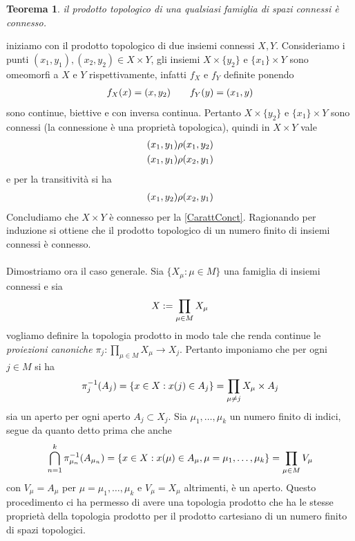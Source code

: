 \documentclass[oneside, 11pt]{amsbook}
\makeatletter
\newcommand{\0}{{(0)}}
\newcommand{\3}{{(3)}}
\theoremstyle{colonplain}
\newtheorem{thm}{Teorema}[chapter]
\theoremstyle{colondefinition}
\theoremstyle{colonremark}
\numberwithin{equation}{chapter}
\renewcommand{\proofname}{Dimostrazione}
\renewenvironment{proof}[1][\proofname]{\par
  \pushQED{\qed}%
  \normalfont \topsep6\p@\@plus6\p@\relax
  \trivlist
  \item[\hskip\labelsep\bfseries #1:]\ignorespaces
}{%
  \popQED\endtrivlist\@endpefalse
}
\makeatother
\begin{document}
\begin{thm}
il prodotto topologico di una qualsiasi famiglia di spazi connessi è connesso.
\end{thm}
\begin{proof}
iniziamo con il prodotto topologico di due insiemi connessi $X, Y$. Consideriamo i punti $(x_1, y_1), (x_2, y_2) \in X \times Y$, gli insiemi $X \times \{ y_2 \}$ e $\{ x_1 \} \times Y$ sono omeomorfi a $X$ e $Y$ rispettivamente, infatti $f_X$ e $f_Y$ definite ponendo
\begin{align}
    f_X(x) = (x, y_2) \qquad f_Y(y) = (x_1, y) \notag
\end{align}
sono continue, biettive e con inversa continua. Pertanto $X \times \{ y_2 \}$ e $\{ x_1 \} \times Y$ sono connessi (la connessione è una proprietà topologica), quindi in $X \times Y$ vale
\begin{align}
    (x_1, y_1) \rho (x_1, y_2) \notag \\
    (x_1, y_1) \rho (x_2, y_1) \notag
\end{align}
e per la transitività si ha
\begin{align}
    (x_1, y_2) \rho (x_2, y_1) \notag
\end{align}
Concludiamo che $X \times Y$ è connesso per la \cref{CarattConct}. Ragionando per induzione si ottiene che il prodotto topologico di un numero finito di insiemi connessi è connesso. \\ \\
Dimostriamo ora il caso generale. Sia $\{ X_\mu : \mu \in M \}$ una famiglia di insiemi connessi e sia 
\begin{align}
    X := \prod_{\mu \in M} X_\mu \notag
\end{align}
vogliamo definire la topologia prodotto in modo tale che renda continue le \textit{proiezioni canoniche} $\pi_j : \prod_{\mu \in M} X_\mu \longrightarrow X_j$. Pertanto imponiamo che per ogni $j \in M$ si ha
\begin{align}
    \pi_j^{-1}(A_j) = \{ x \in X : x(j) \in A_j \} = \prod_{\mu \neq j} X_\mu \times A_j \notag
\end{align}
sia un aperto per ogni aperto $A_j \subset X_j$. Sia $\mu_1, \dots, \mu_k$ un numero finito di indici, segue da quanto detto prima che anche
\begin{align}
    \bigcap_{n = 1}^k \pi_{\mu_n}^{-1}(A_{\mu_n}) = \{ x \in X : x(\mu) \in A_{\mu}, \mu = \mu_1, \dots, \mu_k \} = \prod_{\mu \in M} V_\mu \notag
\end{align}
con $V_\mu = A_\mu$ per $\mu = \mu_1, \dots, \mu_k$ e $V_\mu = X_\mu$ altrimenti, è un aperto. Questo procedimento ci ha permesso di avere una topologia prodotto che ha le stesse proprietà della topologia prodotto per il prodotto cartesiano di un numero finito di spazi topologici. \\

\end{proof}
\end{document}
